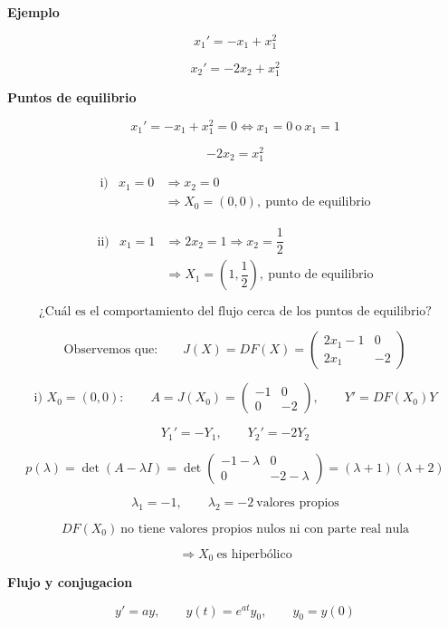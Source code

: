 ﻿\documentclass[11pt,letterpaper]{article}
\begin{document}
\medskip

\textbf{Ejemplo}

\[
x_1'=-x_1+x_1^2
\]

\[
x_2'=-2x_2+x_1^2
\]

\textbf{Puntos de equilibrio}

\[
x_1'=-x_1+x_1^2=0 \iff x_1=0 \ \text{o}\ x_1=1
\]

\[
-2x_2=x_1^2
\]

\[
\begin{array}{rcl}
\text{i)} & x_1=0 &\Rightarrow x_2=0 \\
          &       &\Rightarrow X_0=(0,0),\ \text{punto de equilibrio}
\end{array}
\]

\[
\begin{array}{rcl}
\text{ii)} & x_1=1 &\Rightarrow 2x_2=1 \Rightarrow x_2=\dfrac12 \\
           &       &\Rightarrow X_1=\left(1,\dfrac12\right),\ \text{punto de equilibrio}
\end{array}
\]

\[
\text{¿Cuál es el comportamiento del flujo cerca de los puntos de equilibrio?}
\]

\[
\text{Observemos que:}\qquad
J(X)=DF(X)=
\begin{pmatrix}
2x_1-1 & 0\\
2x_1 & -2
\end{pmatrix}
\]

\[
\text{i) }X_0=(0,0):\qquad
A=J(X_0)=
\begin{pmatrix}
-1 & 0\\
0 & -2
\end{pmatrix},
\qquad Y'=DF(X_0)Y
\]

\[
Y_1'=-Y_1,\qquad Y_2'=-2Y_2
\]

\[
p(\lambda)=\det(A-\lambda I)
=
\det\begin{pmatrix}
-1-\lambda & 0\\
0 & -2-\lambda
\end{pmatrix}
= (\lambda+1)(\lambda+2)
\]

\[
\lambda_1=-1,\qquad \lambda_2=-2
\ \text{valores propios}
\]

\[
DF(X_0)\ \text{no tiene valores propios nulos ni con parte real nula}
\]

\[
\Rightarrow X_0\ \text{es hiperb\'olico}
\]

\newpage

\textbf{Flujo y conjugacion}

\[
y' = ay, \qquad y(t)=e^{at}y_0, \qquad y_0=y(0)
\]
\end{document}
